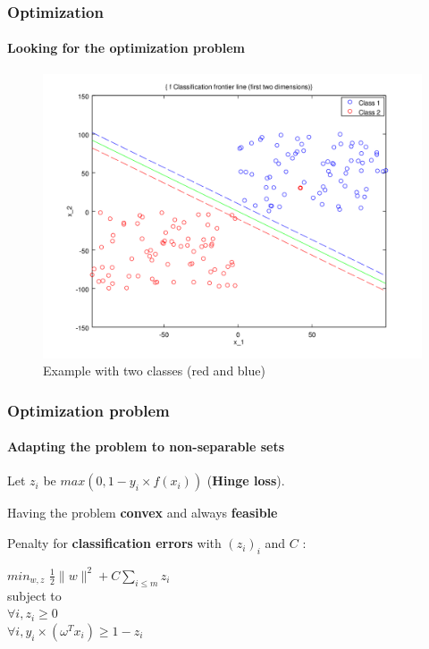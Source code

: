 \documentclass{beamer}
\begin{document}
\begin{frame}
\frametitle{Optimization}
\framesubtitle{Looking for the optimization problem}

         \begin{figure}
         \centering
         \caption{Example with two classes (red and blue)}
         \includegraphics[scale=0.4]{images/voronoi2.png}
         \end{figure}

\end{frame}

\begin{frame}
\frametitle{Optimization problem}
\framesubtitle{Adapting the problem to \textbf{non-separable sets}}

Let $z_i$ be $max(0, 1-y_i \times f(x_i))$ (\textbf{Hinge loss}).

\pause

\bigskip

\begin{block}{Having the problem \textbf{convex} and always \textbf{feasible}}

Penalty for \textbf{classification errors} with $(z_i)_i$ and $C$ :

           \begin{center}
           $min_{w, z}$ $\frac{1}{2} \|w\|^2 + C \sum_{i \leq m}z_i$\\
           subject to\\ $\forall i, z_i \geq 0$\\
           $\forall i, y_i \times (\omega^{T} x_i) \geq 1 - z_i$\\
           \end{center}

\end{block}

\end{frame}
\end{document}
